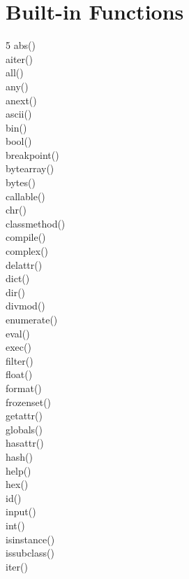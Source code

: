 \documentclass [8pt] {extarticle}
\begin{document}
    \section {Built-in Functions}

    \begin {multicols} {5}
        abs() \\
        aiter() \\
        all() \\
        any() \\
        anext() \\
        ascii() \\
        bin() \\
        bool() \\
        breakpoint() \\
        bytearray() \\
        bytes() \\
        callable() \\
        chr() \\
        classmethod() \\
        compile() \\
        complex() \\
        delattr() \\
        dict() \\
        dir() \\
        divmod() \\
        enumerate() \\
        eval() \\
        exec() \\
        filter() \\
        float() \\
        format() \\
        frozenset() \\
        getattr() \\
        globals() \\
        hasattr() \\
        hash() \\
        help() \\
        hex() \\
        id() \\
        input() \\
        int() \\
        isinstance() \\
        issubclass() \\
        iter() \\

\end{multicols}
\end{document}
